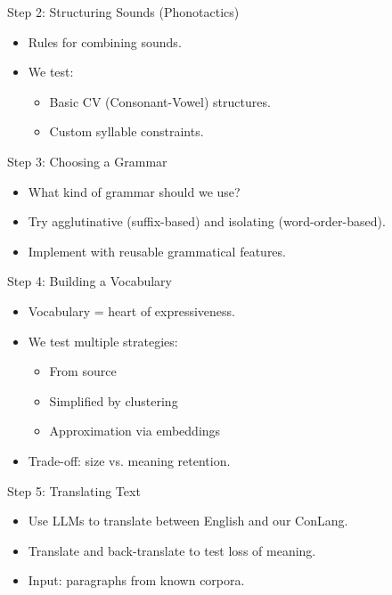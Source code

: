 \documentclass{beamer}
\begin{document}
\begin{frame}{Step 2: Structuring Sounds (Phonotactics)}
	\begin{itemize}
		\item Rules for combining sounds.
		\item We test:
		\begin{itemize}
			\item Basic CV (Consonant-Vowel) structures.
			\item Custom syllable constraints.
		\end{itemize}
	\end{itemize}
\end{frame}

\begin{frame}{Step 3: Choosing a Grammar}
	\begin{itemize}
		\item What kind of grammar should we use?
		\item Try agglutinative (suffix-based) and isolating (word-order-based).
		\item Implement with reusable grammatical features.
	\end{itemize}
\end{frame}

\begin{frame}{Step 4: Building a Vocabulary}
	\begin{itemize}
		\item Vocabulary = heart of expressiveness.
		\item We test multiple strategies:
		\begin{itemize}
			\item From source
			\item Simplified by clustering
			\item Approximation via embeddings
		\end{itemize}
		\item Trade-off: size vs. meaning retention.
	\end{itemize}
\end{frame}

\begin{frame}{Step 5: Translating Text}
	\begin{itemize}
		\item Use LLMs to translate between English and our ConLang.
		\item Translate and back-translate to test loss of meaning.
		\item Input: paragraphs from known corpora.
	\end{itemize}
\end{frame}
\end{document}

